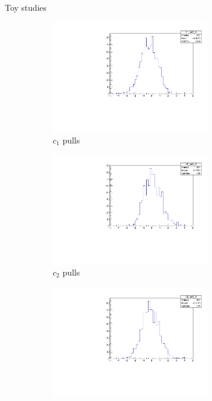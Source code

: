 \documentclass{beamer}
\begin{document}
\begin{frame}{Toy studies}
  \begin{figure}
    \centering
    \begin{subfigure}{0.5\textwidth}
      \centering
      \includegraphics[width=0.75\textwidth,trim={0 0 0 0},clip=true]{Plots/c1_ToyFits_pull.pdf}
      \caption{$c_1$ pulls}
    \end{subfigure}%
    \begin{subfigure}{0.5\textwidth}
      \centering
      \includegraphics[width=0.75\textwidth,trim={0 0 0 0},clip=true]{Plots/c2_ToyFits_pull.pdf}
      \caption{$c_2$ pulls}
    \end{subfigure}
    \begin{subfigure}{0.5\textwidth}
      \centering
      \includegraphics[width=0.75\textwidth,trim={0 0 0 0},clip=true]{Plots/c3_ToyFits_pull.pdf}

\end{subfigure}
\end{figure}
\end{frame}
\end{document}
